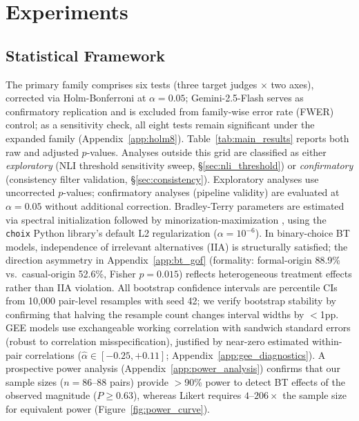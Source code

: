 \section{Experiments}
\label{sec:experiments}


\subsection{Statistical Framework}
\label{sec:stat_framework}

The primary family comprises six tests (three target judges $\times$ two axes), corrected via Holm-Bonferroni at $\alpha = 0.05$; Gemini-2.5-Flash serves as confirmatory replication and is excluded from family-wise error rate (FWER) control; as a sensitivity check, all eight tests remain significant under the expanded family (Appendix~\ref{app:holm8}).
Table~\ref{tab:main_results} reports both raw and adjusted $p$-values.
Analyses outside this grid are classified as either \emph{exploratory} (NLI threshold sensitivity sweep, \S\ref{sec:nli_threshold}) or \emph{confirmatory} (consistency filter validation, \S\ref{sec:consistency}).
Exploratory analyses use uncorrected $p$-values; confirmatory analyses (pipeline validity) are evaluated at $\alpha = 0.05$ without additional correction.
Bradley-Terry parameters \citep{bradley1952rank,luce1959individual} are estimated via spectral initialization followed by minorization-maximization \citep{hunter2004mm}, using the \texttt{choix} Python library's default L2 regularization ($\alpha = 10^{-6}$).
In binary-choice BT models, independence of irrelevant alternatives (IIA) is structurally satisfied; the direction asymmetry in Appendix~\ref{app:bt_gof} (formality: formal-origin 88.9\% vs.\ casual-origin 52.6\%, Fisher $p = 0.015$) reflects heterogeneous treatment effects rather than IIA violation.
All bootstrap confidence intervals are percentile CIs from 10{,}000 pair-level resamples with seed 42; we verify bootstrap stability by confirming that halving the resample count changes interval widths by $<$1pp.
GEE models use exchangeable working correlation with sandwich standard errors (robust to correlation misspecification), justified by near-zero estimated within-pair correlations ($\hat{\alpha} \in [-0.25, +0.11]$; Appendix~\ref{app:gee_diagnostics}).
A prospective power analysis (Appendix~\ref{app:power_analysis}) confirms that our sample sizes ($n = 86$--$88$ pairs) provide $>$90\% power to detect BT effects of the observed magnitude ($P \geq 0.63$), whereas Likert requires $4$--$206\times$ the sample size for equivalent power (Figure~\ref{fig:power_curve}).

